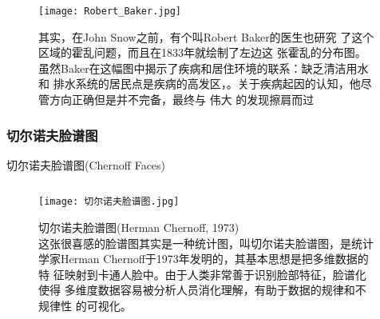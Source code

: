 \begin{frame}{\subsecname}{\subsubsecname}
  \begin{figure}
    \begin{columns}
      \begin{column}{.6\textwidth}
        \texttt{[image: Robert\_Baker.jpg]}
      \end{column}

      \begin{column}{.35\textwidth}
        \centering
        \caption{其实，在John Snow之前，有个叫Robert Baker的医生也研究
          了这个区域的霍乱问题，而且在1833年就绘制了左边这
          张霍乱的分布图。\\
          虽然Baker在这幅图中揭示了疾病和居住环境的联系：缺乏清洁用水和
          排水系统的居民点是疾病的高发区，。关于疾病起因的认知，他尽管方向正确但是并不完备，最终与
          伟大
          的发现擦肩而过\\
          }
      \end{column}
    \end{columns}
  \end{figure}
\end{frame}

\subsubsection{切尔诺夫脸谱图}
\begin{frame}{\subsecname}{切尔诺夫脸谱图(Chernoff Faces)}
  \begin{figure}
    \begin{columns}
      \begin{column}{.6\textwidth}
        \texttt{[image: 切尔诺夫脸谱图.jpg]}
      \end{column}

      \begin{column}{.35\textwidth}
        \centering
        \caption{切尔诺夫脸谱图(Herman Chernoff, 1973)\\
          这张很喜感的脸谱图其实是一种统计图，叫切尔诺夫脸谱图，是统计
          学家Herman Chernoff于1973年发明的，其基本思想是把多维数据的特
          征映射到卡通人脸中。由于人类非常善于识别脸部特征，脸谱化使得
          多维度数据容易被分析人员消化理解，有助于数据的规律和不规律性
          的可视化。}
      \end{column}
    \end{columns}
  \end{figure}
\end{frame}
